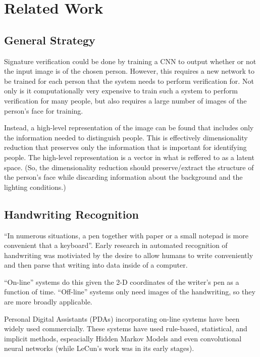 \section{Related Work}\label{sec:related_work}

\subsection{General Strategy}
Signature verification could be done by training a CNN to output whether or not the input image is of the chosen person.
However, this requires a new network to be trained for each person that the system needs to perform verification for.
Not only is it computationally very expensive to train such a system to perform verification for many people, but also requires a large number of images of the person's face for training.

Instead, a high-level representation of the image can be found that includes only the information needed to distinguish people.
This is effectively dimensionality reduction that preserves only the information that is important for identifying people.
The high-level representation is a vector in what is reffered to as a latent space.
(So, the dimensionality reduction should preserve/extract the structure of the person's face while discarding information about the background and the lighting conditions.)

\subsection{Handwriting Recognition} %
``In numerous situations, a pen together with paper or a small notepad is more convenient that a keyboard''\cite{handwriting_survey}.
Early research in automated recognition of handwriting was motiviated by the desire to allow humans to write conveniently and then parse that writing into data inside of a computer.

``On-line'' systems do this given the 2-D coordinates of the writer's pen as a function of time.%
``Off-line'' systems only need images of the handwriting, so they are more broadly applicable\cite{handwriting_survey}.

Personal Digital Assistants (PDAs) incorporating on-line systems have been widely used commercially.
These systems have used rule-based, statistical, and implicit methods\cite{handwriting_survey}, espeacially Hidden Markov Models and even convolutional neural networks\cite{389575} (while LeCun's work was in its early stages\cite{mnist}).

